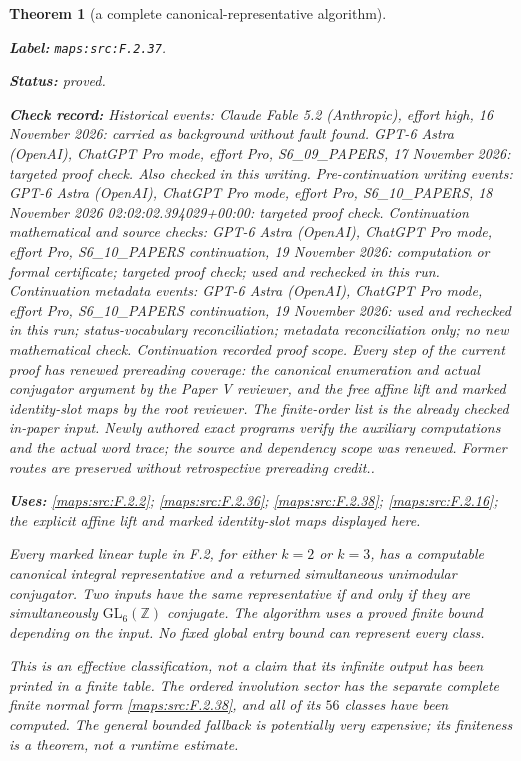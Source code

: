 \documentclass[11pt,a4paper]{article}
\newtheorem{theorem}{Theorem}[section]
\theoremstyle{definition}
\newcommand{\StatementRecord}[4]{\par\smallskip\begingroup\upshape\raggedright\noindent\textbf{Label:} \nolinkurl{#1}.\par\noindent\textbf{Status:} #2.\par\noindent\textbf{Check record:} #3.\par\noindent\textbf{Uses:} #4.\par\endgroup\smallskip}
\begin{document}
\begin{theorem}[a complete canonical-representative algorithm]\label{maps:src:F.2.37}
\StatementRecord{maps:src:F.2.37}{proved}{Historical events: Claude Fable 5.2 (Anthropic), effort high, 16 November 2026: carried as background without fault found. GPT-6 Astra (OpenAI), ChatGPT Pro mode, effort Pro, S6\_09\_PAPERS, 17 November 2026: targeted proof check. Also checked in this writing. Pre-continuation writing events: GPT-6 Astra (OpenAI), ChatGPT Pro mode, effort Pro, S6\_10\_PAPERS, 18 November 2026 02:02:02.394029+00:00: targeted proof check. Continuation mathematical and source checks: GPT-6 Astra (OpenAI), ChatGPT Pro mode, effort Pro, S6\_10\_PAPERS continuation, 19 November 2026: computation or formal certificate; targeted proof check; used and rechecked in this run. Continuation metadata events: GPT-6 Astra (OpenAI), ChatGPT Pro mode, effort Pro, S6\_10\_PAPERS continuation, 19 November 2026: used and rechecked in this run; status-vocabulary reconciliation; metadata reconciliation only; no new mathematical check. \emph{Continuation recorded proof scope.} Every step of the current proof has renewed prereading coverage: the canonical enumeration and actual conjugator argument by the Paper V reviewer, and the free affine lift and marked identity-slot maps by the root reviewer. The finite-order list is the already checked in-paper input. Newly authored exact programs verify the auxiliary computations and the actual word trace; the source and dependency scope was renewed. Former routes are preserved without retrospective prereading credit.}{\cref{maps:src:F.2.2}; \cref{maps:src:F.2.36}; \cref{maps:src:F.2.38}; \cref{maps:src:F.2.16}; the explicit affine lift and marked identity-slot maps displayed here}


Every marked linear tuple in F.2, for either $k=2$ or $k=3$,
has a computable canonical integral representative and a
returned simultaneous unimodular conjugator. Two inputs have
the same representative if and only if they are simultaneously
$\mathrm{GL}_6(\mathbb Z)$ conjugate. The algorithm uses a proved
finite bound depending on the input. No fixed global entry bound
can represent every class.

This is an effective classification, not a claim that its
infinite output has been printed in a finite table. The
ordered involution sector has the separate complete finite
normal form \ref{maps:src:F.2.38}, and all of its $56$ classes have been
computed. The general bounded fallback is potentially very
expensive; its finiteness is a theorem, not a runtime estimate.

\end{theorem}
\end{document}
